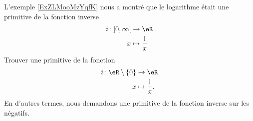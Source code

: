 
\begin{exercice}\label{exoanalyseCTU-0002}

    L'exemple \ref{ExZLMooMzYqfK} nous a montré que le logarithme était une primitive de la fonction inverse
    \begin{equation}
        \begin{aligned}
        i\colon \mathopen] 0 , \infty \mathclose[&\to \eR \\
            x&\mapsto \frac{1}{ x } 
        \end{aligned}
    \end{equation}
    Trouver une primitive de la fonction
    \begin{equation}
        \begin{aligned}
            i\colon \eR\setminus\{ 0 \}&\to \eR \\
            x&\mapsto \frac{1}{ x } .
        \end{aligned}
    \end{equation}
    En d'autres termes, nous demandons une primitive de la fonction inverse sur les négatifs.

\end{exercice}
